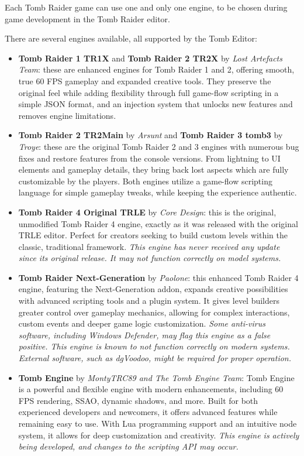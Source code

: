 \begin{remark}
Each Tomb Raider game can use one and only one engine, to be chosen during game development in the Tomb Raider editor.
\end{remark}

There are several engines available, all supported by the Tomb Editor:
\begin{itemize}
    \item \textbf{Tomb Raider 1 TR1X} and \textbf{Tomb Raider 2 TR2X} by \emph{Lost Artefacts Team}: these are enhanced engines for Tomb Raider 1 and 2, offering smooth, true 60 FPS gameplay and expanded creative tools. They preserve the original feel while adding flexibility through full game-flow scripting in a simple JSON format, and an injection system that unlocks new features and removes engine limitations.
    \item \textbf{Tomb Raider 2 TR2Main} by \emph{Arsunt} and \textbf{Tomb Raider 3 tomb3} by \emph{Troye}: these are the original Tomb Raider 2 and 3 engines with numerous bug fixes and restore features from the console versions. From lightning to UI elements and gameplay details, they bring back lost aspects which are fully customizable by the players. Both engines utilize a game-flow scripting language for simple gameplay tweaks, while keeping the experience authentic.
    \item \textbf{Tomb Raider 4 Original TRLE} by \emph{Core Design}: this is the original, unmodified Tomb Raider 4 engine, exactly as it was released with the original TRLE editor. Perfect for creators seeking to build custom levels within the classic, traditional framework. \emph{This engine has never received any update since its original release. It may not function correctly on model systems.}
    \item \textbf{Tomb Raider Next-Generation} by \emph{Paolone}: this enhanced Tomb Raider 4 engine, featuring the Next-Generation addon, expands creative possibilities with advanced scripting tools and a plugin system. It gives level builders greater control over gameplay mechanics, allowing for complex interactions, custom events and deeper game logic customization. \emph{Some anti-virus software, including \emph{Windows Defender}, may flag this engine as a false positive. This engine is known to not function correctly on modern systems. External software, such as \emph{dgVoodoo}, might be required for proper operation.}
    \item \textbf{Tomb Engine} by \emph{MontyTRC89 and The Tomb Engine Team}: Tomb Engine is a powerful and flexible engine with modern enhancements, including 60 FPS rendering, SSAO, dynamic shadows, and more. Built for both experienced developers and newcomers, it offers advanced features while remaining easy to use. With Lua programming support and an intuitive node system, it allows for deep customization and creativity. \emph{This engine is actively being developed, and changes to the scripting API may occur.}
\end{itemize}

